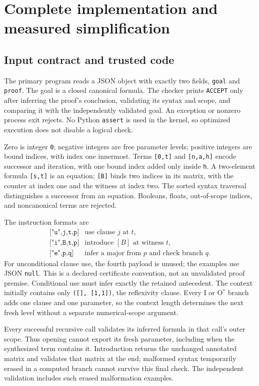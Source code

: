 \section{Complete implementation and measured simplification}
\label{sec:implementation}

\subsection{Input contract and trusted code}
The primary program reads a JSON object with exactly two fields,
\texttt{goal} and \texttt{proof}. The goal is a closed canonical formula.
The checker prints \texttt{ACCEPT} only after inferring the proof's
conclusion, validating its syntax and scope, and comparing it with the
independently validated goal. An exception or nonzero process exit rejects.
No Python \texttt{assert} is used in the kernel, so optimized execution
does not disable a logical check.

Zero is integer \texttt{0}; negative integers are free parameter levels;
positive integers are bound indices, with index one innermost. Terms
\texttt{[0,t]} and \texttt{[n,a,h]} encode successor and iteration, with
one bound index added only inside \texttt{h}. A two-element formula
\texttt{[s,t]} is an equation; \texttt{[B]} binds two indices in its
matrix, with the counter at index one and the witness at index two.
The sorted syntax traversal distinguishes a successor from an equation.
Booleans, floats, out-of-scope indices, and noncanonical terms are rejected.

The instruction formats are
\[
\begin{array}{ll}
 \texttt{["u",j,t,p]}&\text{use clause }j\text{ at }t,\\
 \texttt{["i",B,t,p]}&\text{introduce }[B]\text{ at witness }t,\\
 \texttt{["e",p,q]}&\text{infer a major from }p\text{ and check branch }q.
\end{array}
\]
For unconditional clause use, the fourth payload is unused; the examples
use JSON \texttt{null}. This is a declared certificate convention, not
an unvalidated proof premise. Conditional use must infer exactly the
retained antecedent. The context initially contains only
\texttt{([], [1,1])}, the reflexivity clause. Every I or O$^*$ branch adds
one clause and one parameter, so the context length determines the next
fresh level without a separate numerical-scope argument.

Every successful recursive call validates its inferred formula in that
call's outer scope. Thus opening cannot export its fresh parameter,
including when the synthesized term contains it. Introduction returns
the unchanged annotated matrix and validates that matrix at the end;
malformed syntax temporarily erased in a computed branch cannot survive
this final check. The independent validation includes such erased
malformation examples.

